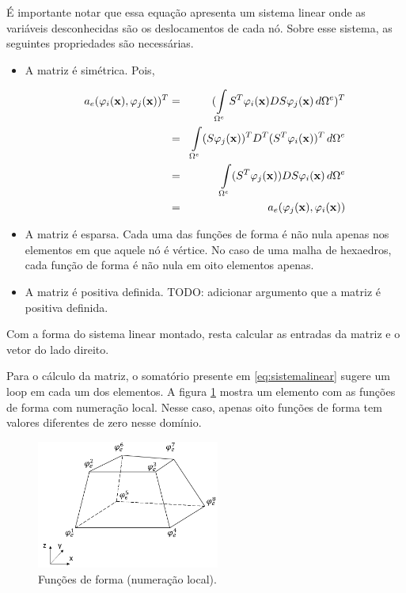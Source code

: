 É importante notar que essa equação apresenta um sistema linear onde as variáveis desconhecidas são os deslocamentos de cada nó. Sobre esse sistema, as seguintes propriedades são necessárias.

\begin{itemize}
    \item A matriz é simétrica. Pois,

    \begin{eqnarray}
    a_e(\varphi_i(\mathbf{x}),\varphi_j(\mathbf{x}))^T & = & (\int\limits_{\Omega^e} S^T\varphi_i(\mathbf{x}) D S\varphi_j(\mathbf{x}) \, d\Omega^e)^T \\
                         & = & \int\limits_{\Omega^e} (S\varphi_j(\mathbf{x}))^T D^T (S^T\varphi_i(\mathbf{x}))^T \, d\Omega^e \\
                         & = & \int\limits_{\Omega^e} (S^T\varphi_j(\mathbf{x})) D S \varphi_i(\mathbf{x}) \, d\Omega^e \\
                         & = & a_e(\varphi_j(\mathbf{x}),\varphi_i(\mathbf{x}))
    \end{eqnarray}

    \item A matriz é esparsa. Cada uma das funções de forma é não nula apenas nos elementos em que aquele nó é vértice. No caso de uma malha de hexaedros, cada função de forma é não nula em oito elementos apenas.

    \item A matriz é positiva definida. {\color{red}TODO: adicionar argumento que a matriz é positiva definida.}
\end{itemize}

Com a forma do sistema linear montado, resta calcular as entradas da matriz e o vetor do lado direito.

Para o cálculo da matriz, o somatório presente em \ref{eq:sistemalinear} sugere um loop em cada um dos elementos. A figura \ref{fig:elem_func_form_local} mostra um elemento com as funções de forma com numeração local. Nesse caso, apenas oito funções de forma tem valores diferentes de zero nesse domínio.

\begin{figure}[!htbp]
\centering
\includegraphics[width=6cm]{chap01/elemento_original_func_forma.png}
\caption{Funções de forma (numeração local).}
\label{fig:elem_func_form_local}
\end{figure}


